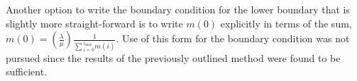 \documentclass[review]{elsarticle}
\newcommand{\imax}{\ensuremath{i_{\max}}\xspace}
\begin{document}
Another option to write the boundary condition for the lower boundary that is slightly more straight-forward is to write $m(0)$ explicitly in terms of the sum, $m(0)=\left(\frac{\lambda}{\mu}\right)\frac{1}{\sum{}_{i=0}^{\imax}m(i)}$.
Use of this form for the boundary condition was not pursued since the results of the previously outlined method were found to be sufficient.







\end{document}
